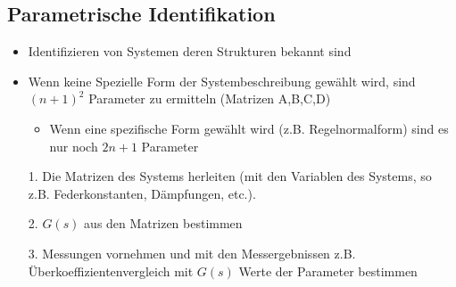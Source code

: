 \subsection{Parametrische Identifikation}
\begin{itemize}
	\item Identifizieren von Systemen deren Strukturen bekannt sind
	\item Wenn keine Spezielle Form der Systembeschreibung gewählt wird, sind $(n+1)^2$ Parameter zu ermitteln (Matrizen A,B,C,D)
	\begin{itemize}
		\item  Wenn eine spezifische Form gewählt wird (z.B. Regelnormalform) sind es nur noch $2n+1$ Parameter
	\end{itemize}
	\item [1.] Die Matrizen des Systems herleiten (mit den Variablen des Systems, so z.B. Federkonstanten, Dämpfungen, etc.). 
	\item [2.] $G(s)$ aus den Matrizen bestimmen
	\item [3.] Messungen vornehmen und mit den Messergebnissen z.B. Überkoeffizientenvergleich mit $G(s)$ Werte der Parameter bestimmen
\end{itemize}

